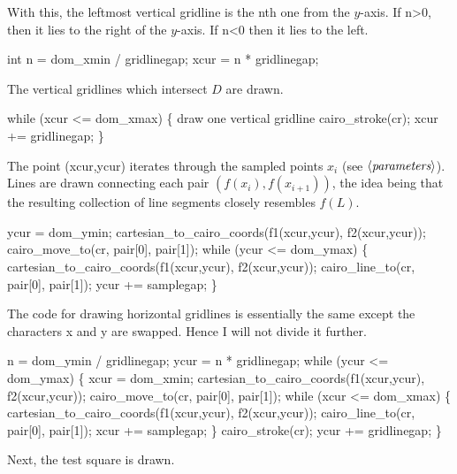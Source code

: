 \documentclass{article}%
\def\refcode#1{$\langle\hbox{\em #1}\rangle$}
\begin{document}
With this, the leftmost vertical gridline is the {\Tt{}n\nwendquote}th one from the $y$-axis. If {\Tt{}n>0\nwendquote}, then it lies to the right of the $y$-axis. If {\Tt{}n<0\nwendquote} then it lies to the left.

\nwenddocs{}\endmoddef\nwstartdeflinemarkup\nwenddeflinemarkup
int n = dom_xmin / gridlinegap;
xcur = n * gridlinegap;

\nwendcode{}The vertical gridlines which intersect $D$ are drawn.

\nwenddocs{}\endmoddef\nwstartdeflinemarkup\nwenddeflinemarkup
while (xcur <= dom_xmax) \{
        \LA{}draw one vertical gridline\RA{}
        cairo_stroke(cr);
        xcur += gridlinegap;
\}

\nwendcode{}The point {\Tt{}(xcur,ycur)\nwendquote} iterates through the sampled points $x_i$ (see \refcode{parameters}). Lines are drawn connecting each pair $(f(x_i),f(x_{i+1}))$, the idea being that the resulting collection of line segments closely resembles $f(L)$.

\nwenddocs{}\endmoddef\nwstartdeflinemarkup\nwenddeflinemarkup
ycur = dom_ymin;
cartesian_to_cairo_coords(f1(xcur,ycur), f2(xcur,ycur));
cairo_move_to(cr, pair[0], pair[1]);
while (ycur <= dom_ymax) \{
        cartesian_to_cairo_coords(f1(xcur,ycur), f2(xcur,ycur));
        cairo_line_to(cr, pair[0], pair[1]);
        ycur += samplegap;
\}

\nwendcode{}The code for drawing horizontal gridlines is essentially the same except the characters {\Tt{}x\nwendquote} and {\Tt{}y\nwendquote} are swapped. Hence I will not divide it further.

\nwenddocs{}\endmoddef\nwstartdeflinemarkup\nwenddeflinemarkup
n = dom_ymin / gridlinegap;
ycur = n * gridlinegap;
while (ycur <= dom_ymax) \{
        xcur = dom_xmin;
        cartesian_to_cairo_coords(f1(xcur,ycur), f2(xcur,ycur));
        cairo_move_to(cr, pair[0], pair[1]);
        while (xcur <= dom_xmax) \{
                cartesian_to_cairo_coords(f1(xcur,ycur), f2(xcur,ycur));
                cairo_line_to(cr, pair[0], pair[1]);
                xcur += samplegap;
        \}
        cairo_stroke(cr);
        ycur += gridlinegap;
\}

\nwendcode{}Next, the test square is drawn.
\end{document}
